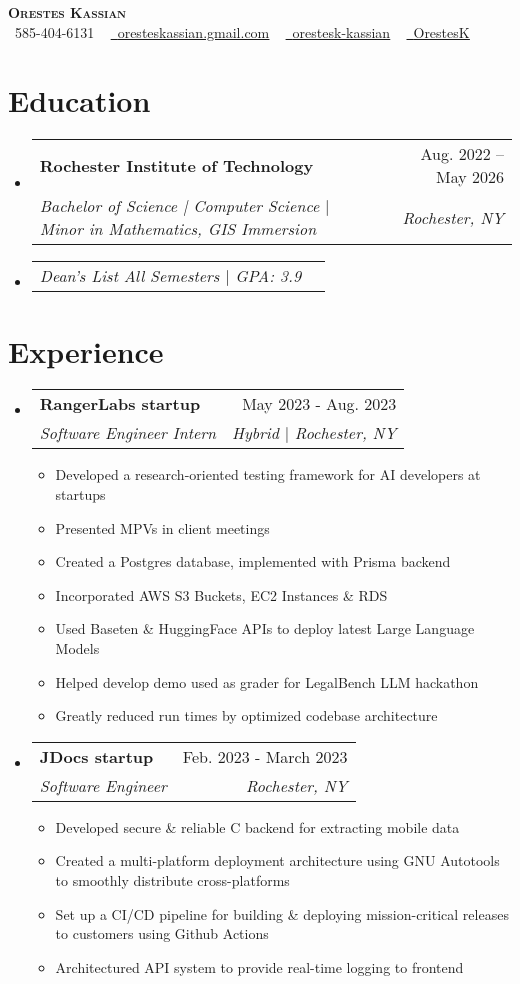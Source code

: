 \documentclass[letterpaper,11pt]{article}
\makeatletter
\newcommand{\resumeItem}[1]{
  \item\small{
    {#1 \vspace{-2pt}}
  }
}
\newcommand{\resumeSubheading}[4]{
  \vspace{-2pt}\item
    \begin{tabular*}{0.97\textwidth}[t]{l@{\extracolsep{\fill}}r}
      \textbf{#1} & #2 \\
      \textit{\small#3} & \textit{\small #4} \\
    \end{tabular*}\vspace{-7pt}
}
\newcommand{\resumeSubSubheading}[2]{
    \item
    \begin{tabular*}{0.97\textwidth}{l@{\extracolsep{\fill}}r}
      \textit{\small#1} & \textit{\small #2} \\
    \end{tabular*}\vspace{-7pt}
}
\newcommand{\resumeSubHeadingListStart}{\begin{itemize}[leftmargin=0.15in, label={}]}
\newcommand{\resumeSubHeadingListEnd}{\end{itemize}}
\newcommand{\resumeItemListStart}{\begin{itemize}}
\newcommand{\resumeItemListEnd}{\end{itemize}\vspace{-5pt}}
\makeatother
\begin{document}
\begin{center}
    \textbf{\Huge \scshape Orestes Kassian} \\ \vspace{4pt}
    \small 
    \faPhone\ 585-404-6131 ~
    \href{oresteskassian@gmail.com}{\faEnvelope\ \uline{oresteskassian.gmail.com}} ~
    \href{https://linkedin.com/in/orestes-kassian}{\faLinkedin\ \uline{orestesk-kassian}} ~
    \href{https://github.com/OrestesK}{\faGithub\ \uline{OrestesK}}
\end{center}
\vspace{-22pt}

\section{Education}
\resumeSubHeadingListStart
    \resumeSubheading
        {Rochester Institute of Technology}{ Aug. 2022 -- May 2026}
        {Bachelor of Science | Computer Science $|$ Minor in Mathematics, GIS Immersion}{ Rochester, NY}
    \vspace{-8pt}
    \resumeSubSubheading
        {Dean’s List All Semesters $|$ GPA: 3.9}{}
\resumeSubHeadingListEnd

\section{Experience}
\resumeSubHeadingListStart
    \resumeSubheading
        {RangerLabs startup}{ May 2023 - Aug. 2023}
        {Software Engineer Intern}{ Hybrid $|$ Rochester, NY}
    \resumeItemListStart
        \resumeItem{Developed a research-oriented testing framework for AI developers at startups}
        \resumeItem{Presented MPVs in client meetings}
        \resumeItem{Created a Postgres database, implemented with Prisma backend}
        \resumeItem{Incorporated AWS S3 Buckets, EC2 Instances \& RDS}
        \resumeItem{Used Baseten \& HuggingFace APIs to deploy latest Large Language Models}
        \resumeItem{Helped develop demo used as grader for LegalBench LLM hackathon}
        \resumeItem{Greatly reduced run times by optimized codebase architecture}
    \resumeItemListEnd

    \resumeSubheading
        {JDocs startup}{ Feb. 2023 - March 2023}
        {Software Engineer}{ Rochester, NY}
    \resumeItemListStart
        \resumeItem{Developed secure \& reliable C backend for extracting mobile data}
        \resumeItem{Created a multi-platform deployment architecture using GNU Autotools to smoothly distribute cross-platforms}
        \resumeItem{Set up a CI/CD pipeline for building \& deploying mission-critical releases to customers using Github Actions}
        \resumeItem{Architectured API system to provide real-time logging to frontend}
    \resumeItemListEnd
\resumeSubHeadingListEnd
\end{document}
